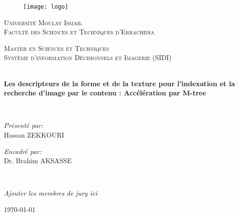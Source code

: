\documentclass[
openany,
11pt, %
french, %
singlespacing, %
headsepline, %
]{MastersDoctoralThesis} %
\begin{document}
\begin{titlepage}
\begin{center}

\begin{figure}[H]
	\centering
	\texttt{[image: logo]}
\end{figure}
{\scshape\LARGE Université Moulay Ismail \\
	Faculté des Sciences et Techniques d’Errachidia \par}\vspace{1.5cm} %

\textsc{\Large Master en Sciences et Techniques \\ Système d’information Décisionnels et Imagerie (SIDI)}\\[0.5cm] %

\HRule \\[0.4cm] %
{\huge \bfseries Les descripteurs de la forme et de la texture pour l’indexation et la recherche d’image par le contenu : Accélération par M-tree \par}\vspace{0.4cm} %
\HRule \\[1.5cm] %
 
\begin{minipage}[t]{0.4\textwidth}
\begin{flushleft} \large
\emph{Présenté par:}\\
Hassan ZEKKOURI
\end{flushleft}
\end{minipage}
\begin{minipage}[t]{0.4\textwidth}
\begin{flushright} \large
\emph{Encadré par:} \\
Dr. Brahim AKSASSE
\end{flushright}
\end{minipage}\\[3cm]
 
\vfill

\large \textit{Ajouter les membres de jury ici}
 
\vfill

{\large \today}\\[4cm] %
 
\vfill
\end{center}
\end{titlepage}
\end{document}
